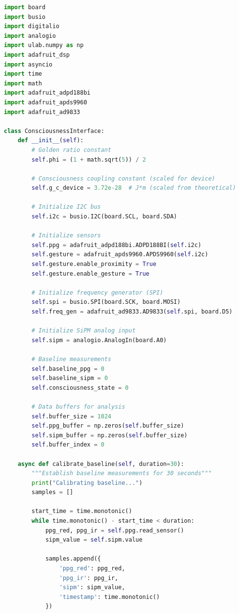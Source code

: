 \documentclass[12pt,a4paper]{article}
\begin{document}
\begin{lstlisting}[language=Python, caption=Main consciousness detection algorithm]
import board
import busio
import digitalio
import analogio
import ulab.numpy as np
import adafruit_dsp
import asyncio
import time
import math
import adafruit_adpd188bi
import adafruit_apds9960
import adafruit_ad9833

class ConsciousnessInterface:
    def __init__(self):
        # Golden ratio constant
        self.phi = (1 + math.sqrt(5)) / 2
        
        # Consciousness coupling constant (scaled for device)
        self.g_c_device = 3.72e-28  # J*m (scaled from theoretical)
        
        # Initialize I2C bus
        self.i2c = busio.I2C(board.SCL, board.SDA)
        
        # Initialize sensors
        self.ppg = adafruit_adpd188bi.ADPD188BI(self.i2c)
        self.gesture = adafruit_apds9960.APDS9960(self.i2c)
        self.gesture.enable_proximity = True
        self.gesture.enable_gesture = True
        
        # Initialize frequency generator (SPI)
        self.spi = busio.SPI(board.SCK, board.MOSI)
        self.freq_gen = adafruit_ad9833.AD9833(self.spi, board.D5)
        
        # Initialize SiPM analog input
        self.sipm = analogio.AnalogIn(board.A0)
        
        # Baseline measurements
        self.baseline_ppg = 0
        self.baseline_sipm = 0
        self.consciousness_state = 0
        
        # Data buffers for analysis
        self.buffer_size = 1024
        self.ppg_buffer = np.zeros(self.buffer_size)
        self.sipm_buffer = np.zeros(self.buffer_size)
        self.buffer_index = 0
        
    async def calibrate_baseline(self, duration=30):
        """Establish baseline measurements for 30 seconds"""
        print("Calibrating baseline...")
        samples = []
        
        start_time = time.monotonic()
        while time.monotonic() - start_time < duration:
            ppg_red, ppg_ir = self.ppg.read_sensor()
            sipm_value = self.sipm.value
            
            samples.append({
                'ppg_red': ppg_red,
                'ppg_ir': ppg_ir,
                'sipm': sipm_value,
                'timestamp': time.monotonic()
            })
            

\end{lstlisting}
\end{document}
